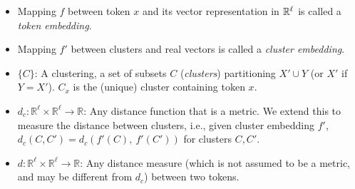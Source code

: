 \begin{itemize}
\setlength\itemsep{0em}

    \item Mapping $f$ between token $x$  and its vector representation in $\mathbb{R}^\ell$ is called a {\em token embedding}. 
    \item Mapping $f'$ between clusters and real vectors is called a {\em cluster embedding}.
    \item $\{C\}$: A clustering, a set of subsets $C$ ({\em clusters}) partitioning $X'\cup Y$ (or $X'$ if $Y = X'$).  $C_x$ is the (unique) cluster  containing token $x$.
    \item $d_c: \mathbb{R}^\ell \times \mathbb{R}^\ell \rightarrow \mathbb{R}$: Any distance function that is a metric. We extend this to measure the distance between clusters, i.e., given cluster embedding $f'$, $d_c(C, C') = d_c\left(f'(C),\ f'(C') \right)$ for clusters $C, C'$.
    \item $d: \mathbb{R}^\ell \times \mathbb{R}^\ell \rightarrow \mathbb{R}$: Any distance measure (which is not assumed to be a metric, and may be different from $d_c$) between two tokens.
\end{itemize}



